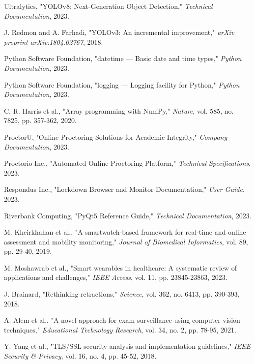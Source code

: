 \documentclass[conference]{IEEEtran}
\begin{document}
\begin{thebibliography}{99}
Ultralytics, "YOLOv8: Next-Generation Object Detection," \textit{Technical Documentation}, 2023.

J. Redmon and A. Farhadi, "YOLOv3: An incremental improvement," \textit{arXiv preprint arXiv:1804.02767}, 2018.

Python Software Foundation, "datetime — Basic date and time types," \textit{Python Documentation}, 2023.

Python Software Foundation, "logging — Logging facility for Python," \textit{Python Documentation}, 2023.

C. R. Harris et al., "Array programming with NumPy," \textit{Nature}, vol. 585, no. 7825, pp. 357-362, 2020.

ProctorU, "Online Proctoring Solutions for Academic Integrity," \textit{Company Documentation}, 2023.

Proctorio Inc., "Automated Online Proctoring Platform," \textit{Technical Specifications}, 2023.

Respondus Inc., "Lockdown Browser and Monitor Documentation," \textit{User Guide}, 2023.

Riverbank Computing, "PyQt5 Reference Guide," \textit{Technical Documentation}, 2023.

M. Kheirkhahan et al., "A smartwatch-based framework for real-time and online assessment and mobility monitoring," \textit{Journal of Biomedical Informatics}, vol. 89, pp. 29-40, 2019.

M. Moshawrab et al., "Smart wearables in healthcare: A systematic review of applications and challenges," \textit{IEEE Access}, vol. 11, pp. 23845-23863, 2023.

J. Brainard, "Rethinking retractions," \textit{Science}, vol. 362, no. 6413, pp. 390-393, 2018.

A. Alem et al., "A novel approach for exam surveillance using computer vision techniques," \textit{Educational Technology Research}, vol. 34, no. 2, pp. 78-95, 2021.

Y. Yang et al., "TLS/SSL security analysis and implementation guidelines," \textit{IEEE Security \& Privacy}, vol. 16, no. 4, pp. 45-52, 2018.

\end{thebibliography}
\end{document}
